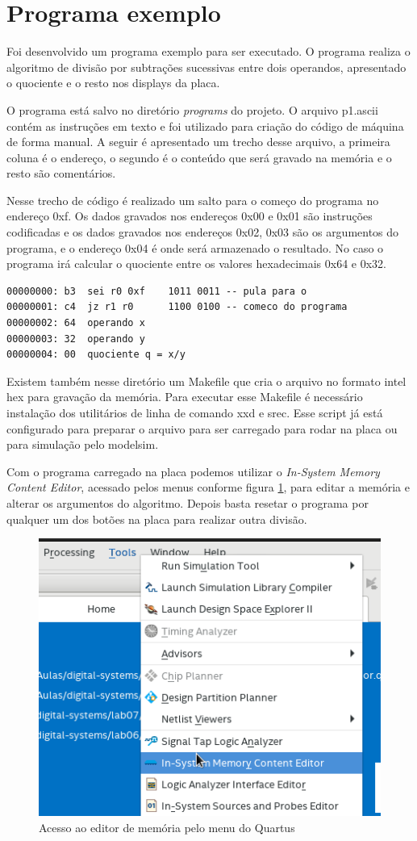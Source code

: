 \documentclass[a4paper, 12pt]{article}
\begin{document}
\newpage
\section{Programa exemplo}

Foi desenvolvido um programa exemplo para ser executado. O programa realiza o algoritmo de divisão
por subtrações sucessivas entre dois operandos, apresentado o quociente e o resto nos displays da placa.

O programa está salvo no diretório \textit{programs} do projeto. 
O arquivo p1.ascii contém as instruções em texto e foi utilizado para criação do código de máquina de forma manual.
A seguir é apresentado um trecho desse arquivo, a primeira coluna é o endereço, o segundo é o conteúdo que será 
gravado na memória e o resto são comentários.

Nesse trecho de código é realizado um salto para o começo do programa no endereço 0xf.
Os dados gravados nos endereços 0x00 e 0x01 são instruções codificadas e os dados
gravados nos endereços 0x02, 0x03 são os argumentos do programa, e o endereço 0x04 é onde será armazenado o resultado.
No caso o programa irá calcular o quociente entre os valores hexadecimais 0x64 e 0x32.

\begin{verbatim}
00000000: b3  sei r0 0xf    1011 0011 -- pula para o
00000001: c4  jz r1 r0      1100 0100 -- comeco do programa
00000002: 64  operando x
00000003: 32  operando y
00000004: 00  quociente q = x/y
\end{verbatim}

Existem também nesse diretório um Makefile que cria o arquivo no formato intel hex para gravação da memória.
Para executar esse Makefile é necessário instalação dos utilitários de linha de comando xxd e srec.
Esse script já está configurado para preparar o arquivo para ser carregado para rodar na placa ou para simulação
pelo modelsim.

Com o programa carregado na placa podemos utilizar o \textit{In-System Memory Content Editor}, acessado pelos menus conforme
figura \ref{fig:editor}, para editar a memória e alterar os argumentos do algoritmo.
Depois basta resetar o programa por qualquer um dos botões na placa para realizar outra divisão.

\begin{figure}[ht]
	\centering
	\includegraphics[width=.4\textwidth]{./images/memory_editor.png}
	\caption{Acesso ao editor de memória pelo menu do Quartus}
	\label{fig:editor}
\end{figure}
\end{document}
